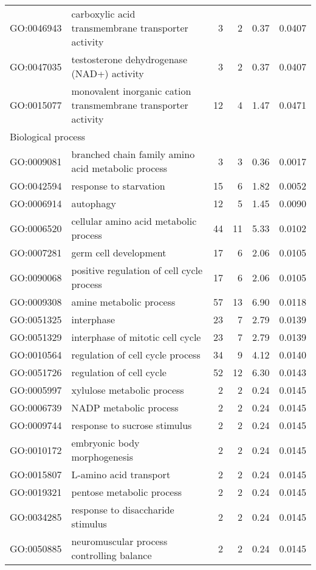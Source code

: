 \begin{longtable}{lp{4.5cm}rrrl}
  GO:0046943 & carboxylic acid transmembrane transporter activity &   3 &   2 & 0.37 & 0.0407 \\ 
  GO:0047035 & testosterone dehydrogenase (NAD+) activity &   3 &   2 & 0.37 & 0.0407 \\ 
  GO:0015077 & monovalent inorganic cation transmembrane transporter activity &  12 &   4 & 1.47 & 0.0471 \\ 
  \hline
   \multicolumn{6}{l}{Biological process}  \\ 
   GO:0009081 & branched chain family amino acid metabolic process &   3 &   3 & 0.36 & 0.0017 \\ 
  GO:0042594 & response to starvation &  15 &   6 & 1.82 & 0.0052 \\ 
  GO:0006914 & autophagy &  12 &   5 & 1.45 & 0.0090 \\ 
  GO:0006520 & cellular amino acid metabolic process &  44 &  11 & 5.33 & 0.0102 \\ 
  GO:0007281 & germ cell development &  17 &   6 & 2.06 & 0.0105 \\ 
  GO:0090068 & positive regulation of cell cycle process &  17 &   6 & 2.06 & 0.0105 \\ 
  GO:0009308 & amine metabolic process &  57 &  13 & 6.90 & 0.0118 \\ 
  GO:0051325 & interphase &  23 &   7 & 2.79 & 0.0139 \\ 
  GO:0051329 & interphase of mitotic cell cycle &  23 &   7 & 2.79 & 0.0139 \\ 
    GO:0010564 & regulation of cell cycle process &  34 &   9 & 4.12 & 0.0140 \\ 
  GO:0051726 & regulation of cell cycle &  52 &  12 & 6.30 & 0.0143 \\ 
  GO:0005997 & xylulose metabolic process &   2 &   2 & 0.24 & 0.0145 \\ 
  GO:0006739 & NADP metabolic process &   2 &   2 & 0.24 & 0.0145 \\ 
  GO:0009744 & response to sucrose stimulus &   2 &   2 & 0.24 & 0.0145 \\ 
  GO:0010172 & embryonic body morphogenesis &   2 &   2 & 0.24 & 0.0145 \\ 
  GO:0015807 & L-amino acid transport &   2 &   2 & 0.24 & 0.0145 \\ 
  GO:0019321 & pentose metabolic process &   2 &   2 & 0.24 & 0.0145 \\ 
  GO:0034285 & response to disaccharide stimulus &   2 &   2 & 0.24 & 0.0145 \\ 
  GO:0050885 & neuromuscular process controlling balance &   2 &   2 & 0.24 & 0.0145 \\ 

\end{longtable}
